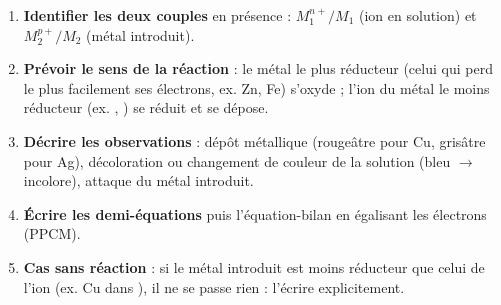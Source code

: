 \documentclass[11pt]{article}
\newcommand{\cle}[1]{{\popxbold\color{popdark}#1}}
\begin{document}
\begin{methode}
\begin{enumerate}
\item \textbf{Identifier les deux couples} en présence : $M_1^{n+}/M_1$ (ion en solution) et $M_2^{p+}/M_2$ (métal introduit).
\item \textbf{Prévoir le sens de la réaction} : le métal le \cle{plus réducteur} (celui qui perd le plus facilement ses électrons, ex. Zn, Fe) s'oxyde ; l'ion du métal le moins réducteur (ex. , ) se réduit et se dépose.
\item \textbf{Décrire les observations} : dépôt métallique (rougeâtre pour Cu, grisâtre pour Ag), décoloration ou changement de couleur de la solution (bleu  $\rightarrow$ incolore), attaque du métal introduit.
\item \textbf{Écrire les demi-équations} puis l'équation-bilan en égalisant les électrons (PPCM).
\item \textbf{Cas sans réaction} : si le métal introduit est moins réducteur que celui de l'ion (ex. Cu dans ), il ne se passe rien : l'écrire explicitement.
\end{enumerate}
\end{methode}
\end{document}
